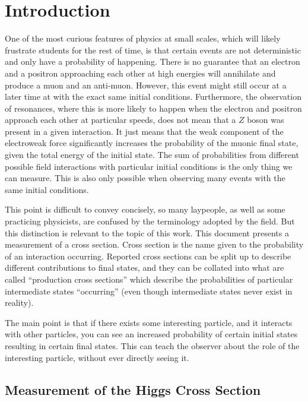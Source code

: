 \chapter{Introduction} \label{ch:intro}

One of the most curious features of physics at small scales, which will likely frustrate students for the rest of time,
is that certain events are not deterministic and only have a probability of happening.
There is no guarantee that an electron and a positron approaching each other at high energies will annihilate and produce a muon and an anti-muon.
However, this event might still occur at a later time at with the exact same initial conditions.
Furthermore, the observation of resonances, where this is more likely to happen when the electron and positron approach each other at particular speeds,
does not mean that a $Z$ boson was present in a given interaction.
It just means that the weak component of the electroweak force significantly increases the probability of the muonic final state, given the total energy of the initial state.
The sum of probabilities from different possible field interactions with particular initial conditions is the only thing we can measure.
This is also only possible when observing many events with the same initial conditions.

This point is difficult to convey concisely, so many laypeople, as well as some practicing physicists, are confused by the terminology adopted by the field.
But this distinction is relevant to the topic of this work.
This document presents a measurement of a cross section.
Cross section is the name given to the probability of an interaction occurring.
Reported cross sections can be split up to describe different contributions to final states,
and they can be collated into what are called ``production cross sections'' which describe
the probabilities of particular intermediate states ``occurring'' (even though intermediate states never exist in reality).

The main point is that if there exists some interesting particle, and it interacts with other particles,
you can see an increased probability of certain initial states resulting in certain final states.
This can teach the observer about the role of the interesting particle, without ever directly seeing it.

\section{Measurement of the Higgs Cross Section}

